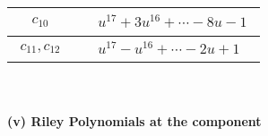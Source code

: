 \documentclass[1p]{elsarticle_modified}
\theoremstyle{definition}
\begin{document}
\begin{tabular}{m{50pt}|m{274pt}}
\hline $$\begin{aligned}c_{10}\end{aligned}$$&$\begin{aligned}
&u^{17}+3 u^{16}+\cdots-8 u-1
\end{aligned}$\\
\hline $$\begin{aligned}c_{11},c_{12}\end{aligned}$$&$\begin{aligned}
&u^{17}- u^{16}+\cdots-2 u+1
\end{aligned}$\\
\hline
\end{tabular}\\~\\
\newpage\renewcommand{\arraystretch}{1}
\flushleft \textbf{(v) Riley Polynomials at the component}\newline \\
\end{document}
